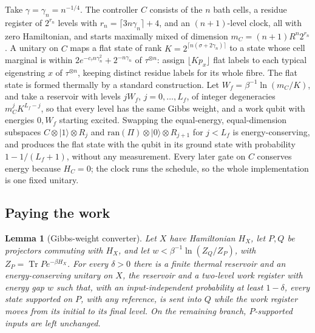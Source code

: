 \documentclass[11pt]{article}
\newtheorem{lemma}[theorem]{Lemma}
\theoremstyle{definition}
\theoremstyle{remark}
\newcommand{\Tr}{\operatorname{Tr}}
\begin{document}
Take $\gamma=\gamma_n=n^{-1/4}$. The controller $C$ consists of the $n$ bath cells, a residue register of $2^{r_n}$ levels with $r_n=\lceil3n\gamma_n\rceil+4$, and an $(n+1)$-level clock, all with zero Hamiltonian, and starts maximally mixed of dimension $m_C=(n+1)R^n2^{r_n}$. A unitary on $C$ maps a flat state of rank $K=2^{\lceil n(\sigma+2\gamma_n)\rceil}$ to a state whose cell marginal is within $2e^{-c_\tau n\gamma_n^2}+2^{-n\gamma_n}$ of $\tau^{\otimes n}$: assign $\lfloor Kp_x\rfloor$ flat labels to each typical eigenstring $x$ of $\tau^{\otimes n}$, keeping distinct residue labels for its whole fibre. The flat state is formed thermally by a standard construction. Let $W_f=\beta^{-1}\ln(m_C/K)$, and take a reservoir with levels $jW_f$, $j=0,\dots,L_f$, of integer degeneracies $m_C^jK^{L_f-j}$, so that every level has the same Gibbs weight, and a work qubit with energies $0,W_f$ starting excited. Swapping the equal-energy, equal-dimension subspaces $C\otimes|1\rangle\otimes R_j$ and $\mathrm{ran}(\Pi)\otimes|0\rangle\otimes R_{j+1}$ for $j<L_f$ is energy-conserving, and produces the flat state with the qubit in its ground state with probability $1-1/(L_f+1)$, without any measurement. Every later gate on $C$ conserves energy because $H_C=0$; the clock runs the schedule, so the whole implementation is one fixed unitary.

\subsection{Paying the work}

\begin{lemma}[Gibbs-weight converter]\label{lem:converter}
Let $X$ have Hamiltonian $H_X$, let $P,Q$ be projectors commuting with $H_X$, and let $w<\beta^{-1}\ln(Z_Q/Z_P)$, with $Z_P=\Tr Pe^{-\beta H_X}$. For every $\delta>0$ there is a finite thermal reservoir and an energy-conserving unitary on $X$, the reservoir and a two-level work register with energy gap $w$ such that, with an input-independent probability at least $1-\delta$, every state supported on $P$, with any reference, is sent into $Q$ while the work register moves from its initial to its final level. On the remaining branch, $P$-supported inputs are left unchanged.
\end{lemma}
\end{document}
